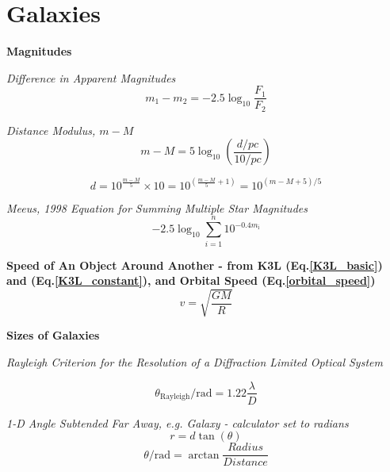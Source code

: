 \documentclass{spy}
\begin{document}








\newpage

\section {Galaxies}
\textbf {Magnitudes}

\textit {Difference in Apparent Magnitudes}
\begin{equation}
m_\mathrm{1} - m_\mathrm{2} = -2.5 \log _\mathrm{10} \frac {F_\mathrm{1}}{F_\mathrm{2}}
\end{equation}

\textit {Distance Modulus, \(m - M\)}
\begin{equation}
m - M = 5 \log _\mathrm{10} \left( \frac {d / pc} {10 / pc} \right)
\end{equation}

\begin{equation}
d = 10^ \frac {m-M}{5} \times 10 = 10^ {\left( {\frac {m-M}{5} + 1} \right)} = 10^{(m-M+5)/5}
\end{equation}

\textit {Meeus, 1998 Equation for Summing Multiple Star Magnitudes}
\begin{equation}
-2.5 \log _{10} \sum_{i = 1}^{n} 10^{-0.4 m_\mathrm{i}}
\end{equation}

\textbf {Speed of An Object Around Another - from K3L (Eq.\ref{K3L_basic}) and (Eq.\ref{K3L_constant}), and Orbital Speed (Eq.\ref{orbital_speed})}
\begin{equation}
v = \sqrt {\frac {GM} {R}}
\end{equation}


\textbf {Sizes of Galaxies}

\textit{Rayleigh Criterion for the Resolution of a Diffraction Limited Optical System}

\begin{equation}
\theta_\mathrm{Rayleigh} / \mathrm{rad} = 1.22 \frac{\lambda}{D}
\end{equation}

\textit{1-D Angle Subtended Far Away, e.g. Galaxy - calculator set to radians}
\begin{equation}
r = d \tan(\theta)
\end{equation}
\begin{equation}
\theta/\mathrm{rad} = \arctan \frac {Radius} {Distance}
\end{equation}
\end{document}
